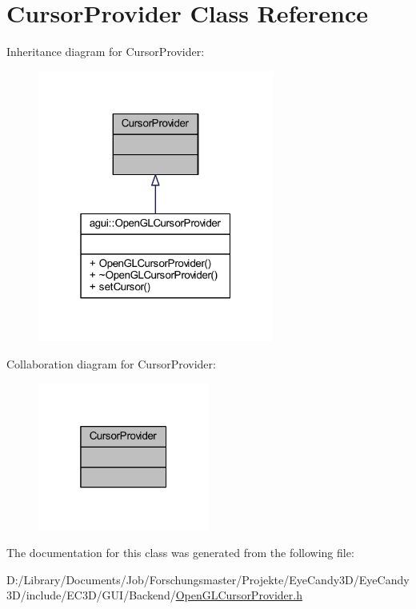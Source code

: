 \hypertarget{class_cursor_provider}{}\section{Cursor\+Provider Class Reference}
\label{class_cursor_provider}


Inheritance diagram for Cursor\+Provider\+:
\nopagebreak
\begin{figure}[H]
\begin{center}
\leavevmode
\includegraphics[width=220pt]{class_cursor_provider__inherit__graph}
\end{center}
\end{figure}


Collaboration diagram for Cursor\+Provider\+:
\nopagebreak
\begin{figure}[H]
\begin{center}
\leavevmode
\includegraphics[width=160pt]{class_cursor_provider__coll__graph}
\end{center}
\end{figure}


The documentation for this class was generated from the following file\+:\begin{DoxyCompactItemize}
\item 
D\+:/\+Library/\+Documents/\+Job/\+Forschungsmaster/\+Projekte/\+Eye\+Candy3\+D/\+Eye\+Candy3\+D/include/\+E\+C3\+D/\+G\+U\+I/\+Backend/\mbox{\hyperlink{_open_g_l_cursor_provider_8h}{Open\+G\+L\+Cursor\+Provider.\+h}}\end{DoxyCompactItemize}
